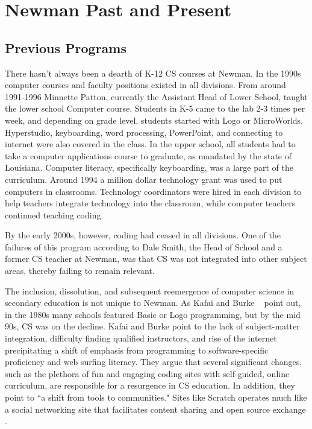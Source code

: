 
\chapter{Newman Past and Present} %

\label{Chapter3} %



\section{Previous Programs}
There hasn't always been a dearth of K-12 CS courses at Newman. In the 1990s computer courses and faculty positions existed in all divisions. From around 1991-1996 Minnette Patton, currently the Assistant Head of Lower School, taught the lower school Computer course. Students in K-5 came to the lab 2-3 times per week, and depending on grade level, students started with Logo or MicroWorlds. Hyperstudio, keyboarding, word processing, PowerPoint, and connecting to internet were also covered in the class. In the upper school, all students had to take a computer applications course to graduate, as mandated by the state of Louisiana. Computer literacy, specifically keyboarding, was a large part of the curriculum. Around 1994 a million dollar technology grant was used to put computers in classrooms. Technology coordinators were hired in each division to help teachers integrate technology into the classroom, while computer teachers continued teaching coding.\par
By the early 2000s, however, coding had ceased in all divisions. One of the failures of this program according to Dale Smith, the Head of School and a former CS teacher at Newman, was that CS was not integrated into other subject areas, thereby failing to remain relevant. \par
The inclusion, dissolution, and subsequent reemergence of computer science in secondary education is not unique to Newman. As Kafai and Burke ~\cite{backtoschool} point out, in the 1980s many schools featured Basic or Logo programming, but by the mid 90s, CS was on the decline. Kafai and Burke point to the lack of subject-matter integration, difficulty finding qualified instructors, and rise of the internet precipitating a shift of emphasis from programming to software-specific proficiency and web surfing literacy. They argue that several significant changes, such as the plethora of fun and engaging coding sites with self-guided, online curriculum, are responsible for a resurgence in CS education. In addition, they point to ``a shift from tools to communities." Sites like Scratch operates much like a social networking site that facilitates content sharing and open source exchange \cite{backtoschool}.



